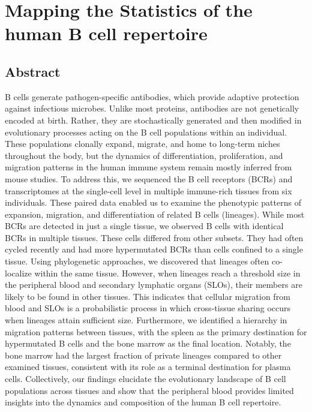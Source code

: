\chapter{Mapping the Statistics of the human B cell repertoire}

\section{Abstract}
B cells generate pathogen-specific antibodies, which provide adaptive protection against infectious microbes. Unlike most proteins, antibodies are not genetically encoded at birth. Rather, they are stochastically generated and then modified in evolutionary processes acting on the B cell populations within an individual. These populations clonally expand, migrate, and home to long-term niches throughout the body, but the dynamics of differentiation, proliferation, and migration patterns in the human immune system remain mostly inferred from mouse studies. To address this, we sequenced the B cell receptors (BCRs) and transcriptomes at the single-cell level in multiple immune-rich tissues from six individuals. These paired data enabled us to examine the phenotypic patterns of expansion, migration, and differentiation of related B cells (lineages). While most BCRs are detected in just a single tissue, we observed B cells with identical BCRs in multiple tissues. These cells differed from other subsets. They had often cycled recently and had more hypermutated BCRs than cells confined to a single tissue. Using phylogenetic approaches, we discovered that lineages often co-localize within the same tissue. However, when lineages reach a threshold size in the peripheral blood and secondary lymphatic organs (SLOs), their members are likely to be found in other tissues. This indicates that cellular migration from blood and SLOs is a probabilistic process in which cross-tissue sharing occurs when lineages attain sufficient size. Furthermore, we identified a hierarchy in migration patterns between tissues, with the spleen as the primary destination for hypermutated B cells and the bone marrow as the final location. Notably, the bone marrow had the largest fraction of private lineages compared to other examined tissues, consistent with its role as a terminal destination for plasma cells. Collectively, our findings elucidate the evolutionary landscape of B cell populations across tissues and show that the peripheral blood provides limited insights into the dynamics and composition of the human B cell repertoire.

